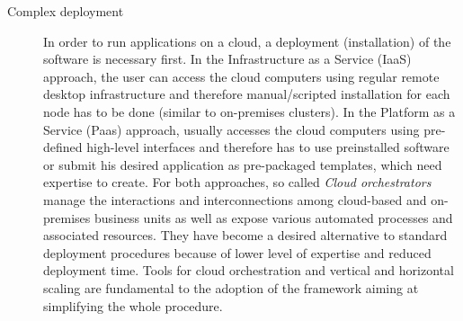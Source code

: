 \documentclass[3p,times]{elsarticle}
\begin{document}
\begin{description}
\item[Complex deployment] In order to run applications on a cloud, a deployment (installation) of the software is necessary first. In the Infrastructure as a Service (IaaS) approach, the user can access the cloud computers using regular remote desktop infrastructure and therefore manual/scripted installation for each node has to be done (similar to on-premises clusters). In the Platform as a Service (Paas) approach, usually accesses the cloud computers using pre-defined high-level interfaces and therefore has to use preinstalled software or submit his desired application as pre-packaged templates, which need expertise to create. For both approaches, so called \textit{Cloud orchestrators} manage the interactions and interconnections among cloud-based and on-premises business units as well as expose various automated processes and associated resources. They have become a desired alternative to standard deployment procedures because of lower level of expertise and reduced deployment time. Tools for cloud orchestration and vertical and horizontal scaling are fundamental to the adoption of the framework aiming at simplifying the whole procedure.


\end{description}
\end{document}
